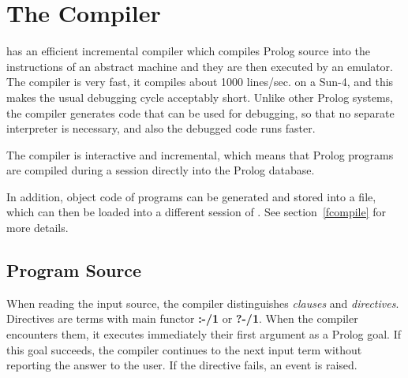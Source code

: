 %
% 
% 
% 
% 
%
%
%
%
\chapter{The Compiler}
\label{chapcompiler}

{\eclipse} has an efficient incremental compiler which compiles
Prolog source into the instructions of an abstract machine
and they are then executed by an emulator.
The compiler is very fast, it compiles about 1000 lines/sec.
on a Sun-4, and this makes the usual debugging cycle acceptably short.
Unlike other Prolog systems, the {\eclipse} compiler generates
code that can be used for debugging, so that no separate
interpreter is necessary, and also the debugged code runs faster.

The {\eclipse} compiler is interactive and incremental, which means
that Prolog programs are compiled during a {\eclipse} session
directly into the Prolog database.

In addition, object code of {\eclipse} programs can be generated and stored
into a file, which can then be loaded into a different session of
{\eclipse}. See section~\ref{fcompile} for more details.

\section{Program Source}
When reading the input source, the compiler distinguishes
{\it clauses} and {\it directives}.
Directives are terms with main functor
{\bf :-/1}
or
{\bf ?-/1}.
When the compiler encounters them, it executes immediately
their first argument as a Prolog goal.
If this goal succeeds, the compiler continues to the next
input term without reporting the answer to the user.
If the directive fails, an event is raised.

